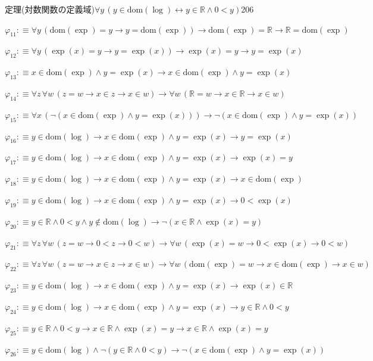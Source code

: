 \begin{fullproof}{定理(対数関数の定義域)}{$\forall y\,(y \in \mathrm{dom}(\log) \leftrightarrow y \in \mathbb{R} \land 0 < y)$}{206}
\begin{abbrevlist}
\item $\varphi_{11} :\equiv \forall y\,(\mathrm{dom}(\exp) = y \to y = \mathrm{dom}(\exp)) \to \mathrm{dom}(\exp) = \mathbb{R} \to \mathbb{R} = \mathrm{dom}(\exp)$
\item $\varphi_{12} :\equiv \forall y\,(\exp(x) = y \to y = \exp(x)) \to \exp(x) = y \to y = \exp(x)$
\item $\varphi_{13} :\equiv x \in \mathrm{dom}(\exp) \land y = \exp(x) \to x \in \mathrm{dom}(\exp) \land y = \exp(x)$
\item $\varphi_{14} :\equiv \forall z\,\forall w\,(z = w \to x \in z \to x \in w) \to \forall w\,(\mathbb{R} = w \to x \in \mathbb{R} \to x \in w)$
\item $\varphi_{15} :\equiv \forall x\,(\neg (x \in \mathrm{dom}(\exp) \land y = \exp(x))) \to \neg (x \in \mathrm{dom}(\exp) \land y = \exp(x))$
\item $\varphi_{16} :\equiv y \in \mathrm{dom}(\log) \to x \in \mathrm{dom}(\exp) \land y = \exp(x) \to y = \exp(x)$
\item $\varphi_{17} :\equiv y \in \mathrm{dom}(\log) \to x \in \mathrm{dom}(\exp) \land y = \exp(x) \to \exp(x) = y$
\item $\varphi_{18} :\equiv y \in \mathrm{dom}(\log) \to x \in \mathrm{dom}(\exp) \land y = \exp(x) \to x \in \mathrm{dom}(\exp)$
\item $\varphi_{19} :\equiv y \in \mathrm{dom}(\log) \to x \in \mathrm{dom}(\exp) \land y = \exp(x) \to 0 < \exp(x)$
\item $\varphi_{20} :\equiv y \in \mathbb{R} \land 0 < y \land y \notin \mathrm{dom}(\log) \to \neg (x \in \mathbb{R} \land \exp(x) = y)$
\item $\varphi_{21} :\equiv \forall z\,\forall w\,(z = w \to 0 < z \to 0 < w) \to \forall w\,(\exp(x) = w \to 0 < \exp(x) \to 0 < w)$
\item $\varphi_{22} :\equiv \forall z\,\forall w\,(z = w \to x \in z \to x \in w) \to \forall w\,(\mathrm{dom}(\exp) = w \to x \in \mathrm{dom}(\exp) \to x \in w)$
\item $\varphi_{23} :\equiv y \in \mathrm{dom}(\log) \to x \in \mathrm{dom}(\exp) \land y = \exp(x) \to \exp(x) \in \mathbb{R}$
\item $\varphi_{24} :\equiv y \in \mathrm{dom}(\log) \to x \in \mathrm{dom}(\exp) \land y = \exp(x) \to y \in \mathbb{R} \land 0 < y$
\item $\varphi_{25} :\equiv y \in \mathbb{R} \land 0 < y \to x \in \mathbb{R} \land \exp(x) = y \to x \in \mathbb{R} \land \exp(x) = y$
\item $\varphi_{26} :\equiv y \in \mathrm{dom}(\log) \land \neg (y \in \mathbb{R} \land 0 < y) \to \neg (x \in \mathrm{dom}(\exp) \land y = \exp(x))$

\end{abbrevlist}
\end{fullproof}
